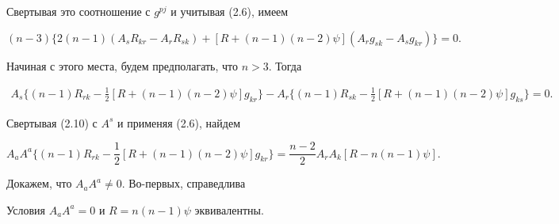 Свертывая это соотношение с $g^{pj}$ и учитывая (2.6), имеем 


$$ 


(n-3)\{2(n-1)(A_s R_{kr}-A_r R_{sk})+ 


[R+(n-1)(n-2)\psi](A_r g_{sk}-A_s g_{kr})\}=0. 


$$ 


 


Начиная с этого места, будем предполагать, что $n>3$. Тогда 


\begin{multline} 


A_s\{(n\!-\!1)R_{rk}\!-\!\tfrac{1}{2}[R\!+\!(n\!-\!1)(n\!-\!2)


\psi]g_{kr}\}\!-\!


A_r\{(n\!-\!1)R_{sk}\!-\!\tfrac{1}{2}[R\!+\!(n\!-\!1)(n\!-\!2)


\psi]g_{ks}\}\!=\!0. 


\end{multline} 


Свертывая (2.10) с $A^s$ и применяя (2.6), найдем 


\begin{equation} 


A_a A^a\{(n-1)R_{rk}-\frac{1}{2}[R+(n-1)(n-2)\psi]g_{kr}\}= 


\frac{n-2}{2}A_r A_k[R-n(n-1)\psi]. 


\end{equation} 


Докажем, что $A_a A^a\ne 0$. Во-первых, справедлива 


 


\begin{lems} 


Условия $A_a A^a=0$ и $R=n(n-1)\psi$ эквивалентны. 


\end{lems} 


 


